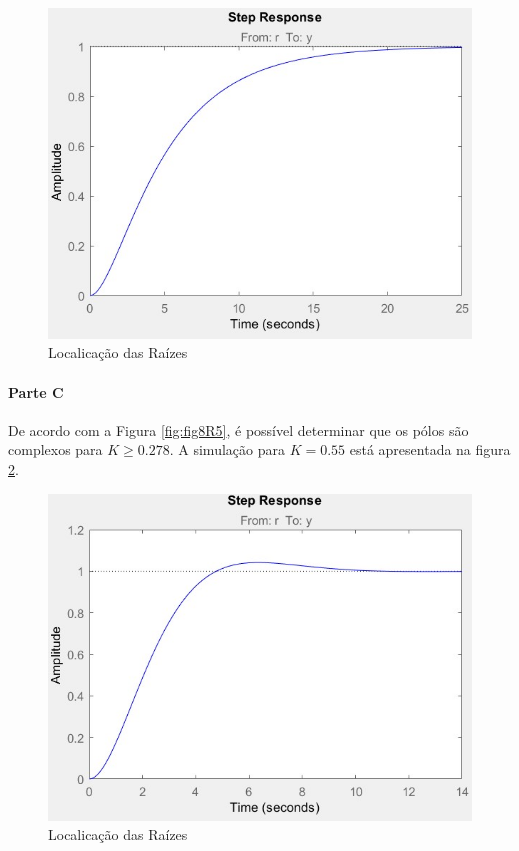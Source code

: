 \documentclass[
]{book}
\theoremstyle{definition}
\theoremstyle{definition}
\theoremstyle{definition}
\theoremstyle{remark}
\begin{document}
\begin{figure}

{\centering \includegraphics{Imagens/Lab8/Resolução/fig3b} 

}

\caption{Localicação das Raízes}\label{fig:fig83b}
\end{figure}

\hypertarget{parte-c-7}{%
\paragraph{Parte C}\label{parte-c-7}}

De acordo com a Figura \ref{fig:fig8R5}, é possível determinar que os pólos são complexos para \(K \geq 0.278\). A simulação para \(K = 0.55\) está apresentada na figura \ref{fig:fig83c1}.

\begin{figure}

{\centering \includegraphics{Imagens/Lab8/Resolução/fig3c1} 

}

\caption{Localicação das Raízes}\label{fig:fig83c1}
\end{figure}
\end{document}
